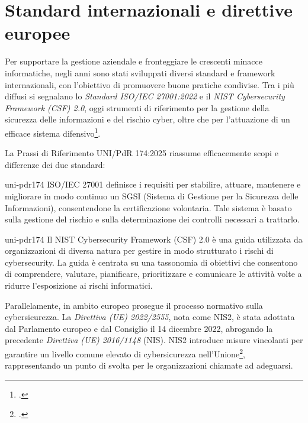 \section{Standard internazionali e direttive europee}
Per supportare la gestione aziendale e fronteggiare le crescenti minacce informatiche, negli anni sono stati 
sviluppati diversi standard e framework internazionali, con l’obiettivo di promuovere buone pratiche condivise.
Tra i più diffusi si segnalano lo \textit{Standard ISO/IEC 27001:2022} e il \textit{NIST Cybersecurity Framework (CSF) 2.0}, 
oggi strumenti di riferimento per la gestione della sicurezza delle informazioni e del rischio cyber, oltre che per 
l’attuazione di un efficace sistema difensivo\footcite[p. 4]{uni-pdr174}.

La Prassi di Riferimento UNI/PdR 174:2025 riassume efficacemente scopi e differenze dei due standard:
\begin{citazione}[p. 4]{uni-pdr174}
    ISO/IEC 27001 definisce i requisiti per stabilire, attuare, mantenere e migliorare in modo
    continuo un SGSI (Sistema di Gestione per la Sicurezza delle Informazioni), consentendone la
    certificazione volontaria. Tale sistema è basato sulla gestione del rischio e sulla
    determinazione dei controlli necessari a trattarlo.
\end{citazione}
\begin{citazione}[p. 4]{uni-pdr174}
    Il NIST Cybersecurity Framework (CSF) 2.0 è una guida utilizzata da organizzazioni di diversa natura
    per gestire in modo strutturato i rischi di cybersecurity. La guida è centrata su una tassonomia di
    obiettivi che consentono di comprendere, valutare, pianificare, prioritizzare e
    comunicare le attività volte a ridurre l’esposizione ai rischi informatici.
\end{citazione}

Parallelamente, in ambito europeo prosegue il processo normativo sulla cybersicurezza.
La \textit{Direttiva (UE) 2022/2555}, nota come NIS2, è stata adottata dal Parlamento europeo e dal Consiglio
il 14 dicembre 2022, abrogando la precedente \textit{Direttiva (UE) 2016/1148} (NIS). NIS2 introduce misure 
vincolanti per garantire un livello comune elevato di cybersicurezza nell’Unione\footcite[art. 1]{nis2-directive}, 
rappresentando un punto di svolta per le organizzazioni chiamate ad adeguarsi.

